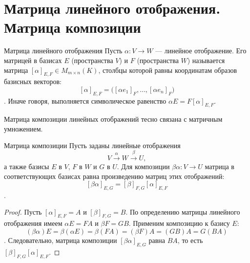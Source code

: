 
\section{Матрица линейного отображения. Матрица композиции}

\begin{Definition}{Матрица линейного отображения}{}
	Пусть $\alpha\colon V\to W$ --- линейное отображение. Его матрицей в базисах $E$ (пространства $V$) и $F$ (пространства $W$) называется матрица $[\alpha]_{E,F}\in M_{m\times n}(K)$, столбцы которой равны координатам образов базисных векторов:
	\[
	[\alpha]_{E,F} = \bigl([\alpha e_1]_F,\ldots,[\alpha e_n]_F\bigr)
	\].
	Иначе говоря, выполняется символическое равенство $\alpha E=F[\alpha]_{E,F}$.
\end{Definition}

Матрица композиции линейных отображений тесно связана с матричным умножением.

\begin{Theorem}{Матрица композиции}{}
	Пусть заданы линейные отображения
	\[
	V \xrightarrow{\alpha} W \xrightarrow{\beta} U,
	\]
	а также базисы $E$ в $V$, $F$ в $W$ и $G$ в $U$.
	Для композиции $\beta\alpha\colon V\to U$ матрица в соответствующих базисах равна произведению матриц этих отображений:
	\[
	[\beta\alpha]_{E,G} = [\beta]_{F,G}[\alpha]_{E,F}
	\].
\end{Theorem}

\begin{proof}
	Пусть $[\alpha]_{E,F}=A$ и $[\beta]_{F,G}=B$. По определению матрицы линейного отображения имеем $\alpha E=FA$ и $\beta F=GB$.
	Применим композицию к базису $E$:
	\[
	(\beta\alpha)E = \beta(\alpha E) = \beta(FA) = (\beta F)A = (GB)A = G(BA)
	\].
	Следовательно, матрица композиции $[\beta\alpha]_{E,G}$ равна $BA$, то есть $[\beta]_{F,G}[\alpha]_{E,F}$.
\end{proof}
